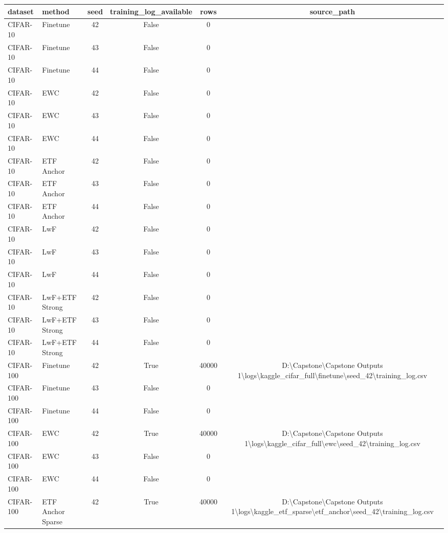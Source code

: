 \begin{tabular}{llcccc}
\hline
dataset & method & seed & training\_log\_available & rows & source\_path \\
\hline
CIFAR-10 & Finetune & 42 & False & 0 &  \\
CIFAR-10 & Finetune & 43 & False & 0 &  \\
CIFAR-10 & Finetune & 44 & False & 0 &  \\
CIFAR-10 & EWC & 42 & False & 0 &  \\
CIFAR-10 & EWC & 43 & False & 0 &  \\
CIFAR-10 & EWC & 44 & False & 0 &  \\
CIFAR-10 & ETF Anchor & 42 & False & 0 &  \\
CIFAR-10 & ETF Anchor & 43 & False & 0 &  \\
CIFAR-10 & ETF Anchor & 44 & False & 0 &  \\
CIFAR-10 & LwF & 42 & False & 0 &  \\
CIFAR-10 & LwF & 43 & False & 0 &  \\
CIFAR-10 & LwF & 44 & False & 0 &  \\
CIFAR-10 & LwF+ETF Strong & 42 & False & 0 &  \\
CIFAR-10 & LwF+ETF Strong & 43 & False & 0 &  \\
CIFAR-10 & LwF+ETF Strong & 44 & False & 0 &  \\
CIFAR-100 & Finetune & 42 & True & 40000 & D:\textbackslash{}Capstone\textbackslash{}Capstone Outputs 1\textbackslash{}logs\textbackslash{}kaggle\_cifar\_full\textbackslash{}finetune\textbackslash{}seed\_42\textbackslash{}training\_log.csv \\
CIFAR-100 & Finetune & 43 & False & 0 &  \\
CIFAR-100 & Finetune & 44 & False & 0 &  \\
CIFAR-100 & EWC & 42 & True & 40000 & D:\textbackslash{}Capstone\textbackslash{}Capstone Outputs 1\textbackslash{}logs\textbackslash{}kaggle\_cifar\_full\textbackslash{}ewc\textbackslash{}seed\_42\textbackslash{}training\_log.csv \\
CIFAR-100 & EWC & 43 & False & 0 &  \\
CIFAR-100 & EWC & 44 & False & 0 &  \\
CIFAR-100 & ETF Anchor Sparse & 42 & True & 40000 & D:\textbackslash{}Capstone\textbackslash{}Capstone Outputs 1\textbackslash{}logs\textbackslash{}kaggle\_etf\_sparse\textbackslash{}etf\_anchor\textbackslash{}seed\_42\textbackslash{}training\_log.csv \\

\end{tabular}
